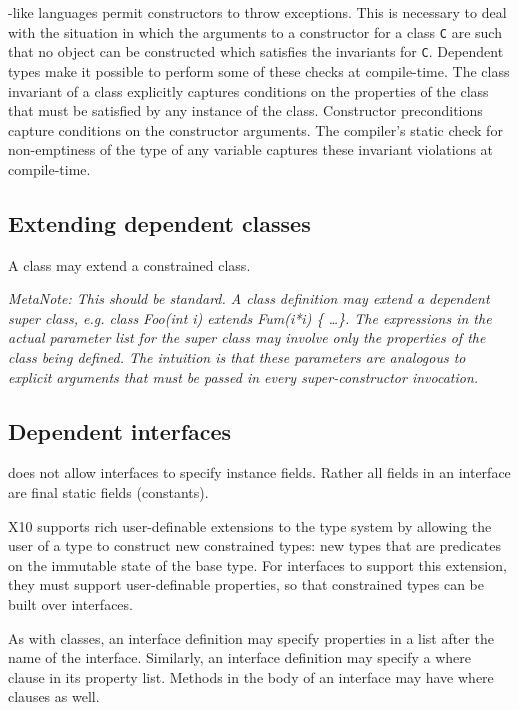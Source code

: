 \java{}-like languages permit constructors to throw exceptions. This
is necessary to deal with the situation in which the arguments to a
constructor for a class {\tt C} are such that no object can be
constructed which satisfies the invariants for {\tt C}. Dependent
types make it possible to perform some of these checks at
compile-time. The class invariant of a class explicitly captures
conditions on the properties of the class that must be satisfied by
any instance of the class.  Constructor preconditions capture
conditions on the constructor arguments.
The compiler's static check for
non-emptiness of the type of any variable captures these invariant
violations at compile-time.




\subsection{Extending dependent classes}

A class may extend a constrained class.

{\em MetaNote: This should be standard. A class definition may extend
a dependent super class, e.g. class Foo(int i) extends Fum(i*i) \{
\ldots \}. The expressions in the actual parameter list for the super
class may involve only the properties of the class being defined. The
intuition is that these parameters are analogous to explicit arguments
that must be passed in every super-constructor invocation.}

\subsection{Dependent interfaces}

\java{} does not allow interfaces to specify instance fields. Rather all
fields in an interface are final static fields (constants).

X10 supports rich user-definable extensions to the type system by
allowing the user of a type to construct new constrained types: new
types that are predicates on the immutable state of the base type.
For interfaces to support this extension, they must support
user-definable properties, so that constrained types can be
built over interfaces.

As with classes, an interface definition may specify properties
in a 
list after the name of the interface. Similarly, an interface
definition may specify a where clause in its property list. Methods
in the body of an interface may have where clauses
as well.

